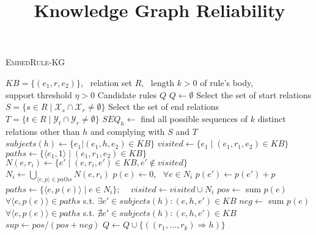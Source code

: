 \documentclass[a4paper,9pt]{article}
\begin{document}
\title{Knowledge Graph Reliability}


\author{\vspace{10mm}}

\maketitle 



\begin{algorithm}[h!]
\caption{\textsc{EmbedRule-KG}}
\label{alg:embedrulekg}
\begin{algorithmic}[1]
\small
\REQUIRE $KB = \{(e_1,r, e_2)\}$, \ relation set $R$, \ length $k > 0$ of rule's body,\  \\  support threshold $\eta > 0$
\ENSURE Candidate rules $Q$
\STATE $Q \gets \emptyset$
	\STATE Select the set of start relations $S = \{s \in R \mid \mathcal{X}_s \cap \mathcal{X}_r \neq \emptyset\}$
	\STATE Select the set of end relations $T = \{t \in R \mid \mathcal{Y}_t \cap \mathcal{Y}_r \neq \emptyset\}$
	\STATE $SEQ_h \gets $ find all possible sequences of $k$ distinct relations other than $h$ and complying with $S$ and $T$ 
	\vspace{1mm}
	\\
	\STATE $subjects(h) \gets \{e_1 | (e_1,h,e_2) \in KB\}$
		\STATE $visited \gets \{e_1 \mid (e_1,r_1,e_2) \in KB \}$
		\STATE $paths \gets \{\langle e_1, 1 \rangle \mid (e_1,r_1,e_2) \in KB \}$
				\STATE $N(e,r_i) \gets \{e' \mid (e,r_i,e') \in KB, e' \notin visited\}$\\\hfill{}
			\ENDFOR
			\STATE $N_i \gets \bigcup_{\langle e, p\rangle \in paths} N(e,r_i) $
			\STATE $p(e) \gets 0$, \ $\forall e \in N_i$
				\STATE $p(e') \gets p(e') + p$
			\ENDFOR
			\STATE $paths \gets \{\langle e, p(e) \rangle \mid e \in N_i \}$; \ \ $visited \gets visited \cup N_i$
		\ENDFOR
			\STATE $pos \gets $ sum $p(e)$ $\forall \langle e, p(e) \rangle \in paths$ s.t. $\exists e' \in subjects(h) : (e,h,e') \in KB$
			\STATE $neg \gets $ sum $p(e)$ $\forall \langle e, p(e) \rangle \in paths$ s.t. $\nexists e' \in subjects(h) : (e,h,e') \in KB$
			\STATE $sup \gets pos/(pos+neg)$
				\STATE $Q \gets Q \cup \{((r_1, \ldots, r_k) \Rightarrow h)\}$
			\ENDIF
		\ENDIF 
	\ENDFOR
\ENDFOR
\end{algorithmic}
\end{algorithm}
\end{document}

